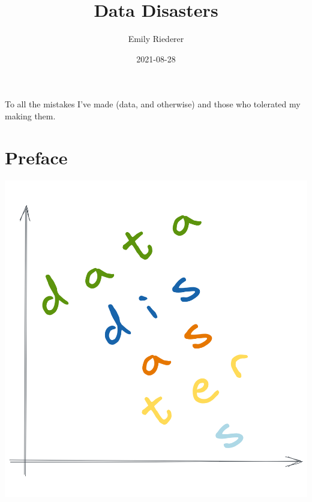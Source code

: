 \documentclass[
]{krantz}
\title{Data Disasters}
\author{Emily Riederer}
\date{2021-08-28}
\begin{document}
\maketitle


\thispagestyle{empty}

\begin{center}
To all the mistakes I've made (data, and otherwise) and those who tolerated my making them.
\end{center}

\setlength{\abovedisplayskip}{-5pt}
\setlength{\abovedisplayshortskip}{-5pt}

{
\hypersetup{linkcolor=}
\setcounter{tocdepth}{2}
\tableofcontents
}
\listoftables
\listoffigures
\hypertarget{preface}{%
\chapter*{Preface}\label{preface}}


\begin{center}\includegraphics[width=0.9\linewidth]{figures/cover} \end{center}
\end{document}
